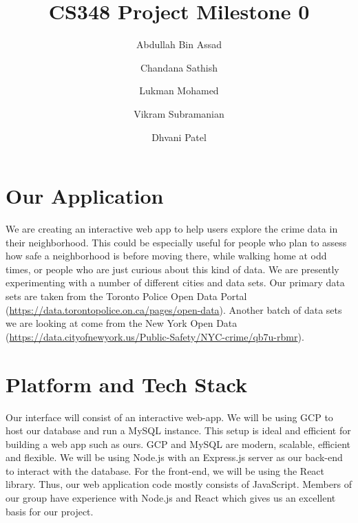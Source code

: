 \documentclass[12pt, a4paper]{article}
\title{CS348 Project Milestone 0}
\author{Abdullah Bin Assad\and Chandana Sathish \and Lukman Mohamed \and Vikram Subramanian \and Dhvani Patel}
\begin{document}
\maketitle

\section*{Our Application}
We are creating an interactive web app to help users explore the crime data in their neighborhood. This could be especially useful for people who plan to assess how safe a neighborhood is before moving there, while walking home at odd times, or people who are just curious about this kind of data. We are presently experimenting with a number of different cities and data sets. Our primary data sets are taken from the Toronto Police Open Data Portal (\url{https://data.torontopolice.on.ca/pages/open-data}). Another batch of data sets we are looking at come from the New York Open Data (\url{https://data.cityofnewyork.us/Public-Safety/NYC-crime/qb7u-rbmr}). 
\section*{Platform and Tech Stack}
Our interface will consist of an interactive web-app. We will be using GCP to host our database and run a MySQL instance. This setup is ideal and efficient for building a web app such as ours. GCP and MySQL are modern, scalable, efficient and flexible. We will be using Node.js with an Express.js server as our back-end to interact with the database. For the front-end, we will be using the React library. Thus, our web application code mostly consists of JavaScript. Members of our group have experience with Node.js and React which gives us an excellent basis for our project.
\end{document}
